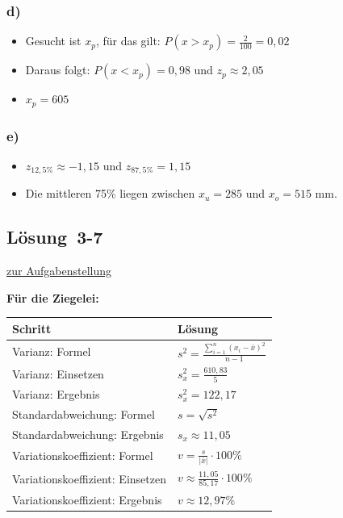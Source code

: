 \documentclass[
  11pt,
  ngerman,
  a4paper,
]{report}
\providecommand{\tightlist}{%
  \setlength{\itemsep}{0pt}\setlength{\parskip}{0pt}}
\begin{document}
\hypertarget{d-5}{%
\subsubsection{d)}\label{d-5}}

\begin{itemize}
\tightlist
\item
  Gesucht ist \(x_p\), für das gilt: \(P(x>x_p) = \frac{2}{100}=0,02\)
\item
  Daraus folgt: \(P(x<x_p) = 0,98\) und \(z_p\approx2,05\)
\item
  \(x_p = 605\)
\end{itemize}

\hypertarget{e-1}{%
\subsubsection{e)}\label{e-1}}

\begin{itemize}
\tightlist
\item
  \(z_{12,5\%}\approx -1,15\) und \(z_{87,5\%}= 1,15\)
\item
  Die mittleren 75\% liegen zwischen \(x_u=285\) und \(x_o=515\) mm.
\end{itemize}

\hypertarget{loesung-3-7}{%
\subsection{Lösung~3-7}\label{loesung-3-7}}

\protect\hyperlink{aufgabe-3-7}{zur Aufgabenstellung}

\textbf{Für die Ziegelei:}

\begin{table}[H]
\centering
\begin{tabular}{ll}
\toprule
\textbf{Schritt} & \textbf{Lösung}\\
\midrule
Varianz: Formel & $s^2=\frac{\sum\limits_{i=1}^{n}(x_{i}-\bar{x})^2}{n-1}$\\
Varianz: Einsetzen & $s^2_x=\frac{610{,}83}{5}$\\
Varianz: Ergebnis & $s^2_x=122{,}17$\\
Standardabweichung: Formel & $s=\sqrt{s^2}$\\
Standardabweichung: Ergebnis & $s_x\approx11{,}05$\\
Variationskoeffizient: Formel & $v=\frac{s}{|\bar{x}|}\cdot100\%\quad$\\
Variationskoeffizient: Einsetzen & $v\approx\frac{11{,}05}{85{,}17}\cdot100\%$\\
Variationskoeffizient: Ergebnis & $v \approx 12{,}97\%$\\
\bottomrule
\end{tabular}
\end{table}
\end{document}
